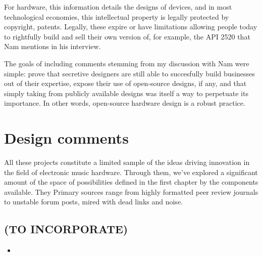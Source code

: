 For hardware, this information details the designs of devices, and in most technological economies, this intellectual property is legally protected by copyright, patents. Legally, these expire or have limitations allowing people today to rightfully build and sell their own version of, for example, the API 2520 that Nam mentions in his interview. 

The goals of including comments stemming from my discussion with Nam were simple: prove that secretive designers are still able to succesfully build businesses out of their expertise, expose their use of open-source designs, if any, and that simply taking from publicly available designs was itself a way to perpetuate its importance. In other words, open-source hardware design is a robust practice. 

\section{Design comments}

All these projects constitute a limited sample of the ideas driving innovation in the field of electronic music hardware. Through them, we've explored a significant amount of the space of possibilities defined in the first chapter by the components available. They  Primary sources range from highly formatted peer review journals to unstable forum posts, mired with dead links and noise.  



\begin{unsortedStuff}	
\section*{(TO INCORPORATE)}
	\begin{itemize}
		\item 
	\end{itemize}
\end{unsortedStuff}
		
\begin{optBlankSpace}
	\newpage
	\mbox{}
\end{optBlankSpace}

